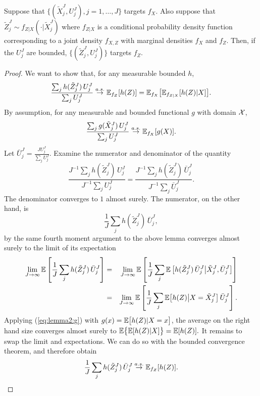 \begin{lem}
    \label{lem:marginal-proper-weights}
    Suppose that $\{(\tilde X_j^J,U_j^J),j=1,\dots,J\}$ targets $f_X$. Also suppose that $\tilde Z_j^J \sim f_{Z|X}(\cdot | \tilde X_j^J)$ where $f_{Z|X}$ is a conditional probability density function corresponding to a joint density $f_{X,Z}$ with marginal densities $f_X$ and $f_Z$. Then, if the $U_j^J$ are bounded, $\{(\tilde Z_j^J,U_j^J)\}$ targets $f_Z$.
\end{lem}
\begin{proof}
    We want to show that, for any measurable bounded $h$, 
     $$\frac{\sum_j h(\tilde Z_j^J) \, U_j^J}{\sum_j U_j^J} \stackrel{a.s.}{\to} \mathbb{E}_{f_Z}[h(Z)] = \mathbb{E}_{f_X}\big[\mathbb{E}_{f_{Z|X}}[h(Z) | X]\big].$$
    By assumption, for any measurable and bounded functional $g$ with domain ${\mathcal{X}}$,
    \begin{equation}\label{eq:lemma2:g}
    \frac{\sum_j g(\tilde X_j^J)\, U_j^J}{\sum_j U_j^J} \stackrel{a.s.}{\to} \mathbb{E}_{f_X}[g(X)].
    \end{equation}
    Let $\bar{U}_j^J = \frac{J U_j^J}{\sum_j U_j^J}$. Examine the numerator and denominator of the quantity $$\frac{J^{-1}\sum_j h(\tilde Z_j^J) \, U_j^J}{J^{-1}\sum_j U_j^J} = \frac{J^{-1}\sum_j h(\tilde Z_j^J) \, \bar{U}_j^J}{J^{-1}\sum_j \bar{U}_j^J}.$$
    The denominator converges to $1$ almost surely. The numerator, on the other hand, is
    $$\frac{1}{J}\sum_j h(\tilde Z_j^J)\, \bar{U}_j^J,$$
    by the same fourth moment argument to the above lemma converges almost surely to the limit of its expectation
    \begin{eqnarray*}        
    \lim_{J\to\infty} \mathbb{E}\left[\frac{1}{J}\sum_j h(\tilde Z_j^J)\, \bar{U}_j^J\right] 
    &=& \lim_{J\to\infty} \mathbb{E} \left[\frac{1}{J}\sum_j  
      \mathbb{E}\left[ h(\tilde Z_j^J)\, \bar{U}_j^J\big|\tilde X_j^J, \bar U_j^J\right]
    \right]
    \\
    &=& \lim_{J\to\infty} \mathbb{E} \left[\frac{1}{J}\sum_j  \mathbb{E}\big[h(Z) \big| X=\tilde X_j^J \big] \, \bar U_j^J\right].
    \end{eqnarray*}
    Applying (\ref{eq:lemma2:g}) with $g(x) = \mathbb{E}\big[h(Z) | X=x\big]$, the average on the right hand size converges almost surely to $\mathbb{E}\big\{\mathbb{E}[h(Z)|X]\big\}=\mathbb{E}[h(Z)].$
    It remains to swap the limit and expectations. We can do so with the bounded convergence theorem, and therefore obtain   
    $$\frac{1}{J}\sum_j h(\tilde Z_j^J)\,\bar{U}_j^J \stackrel{a.s.}{\to} \mathbb{E}_{f_Z}[h(Z)].$$ 
    
\end{proof}

